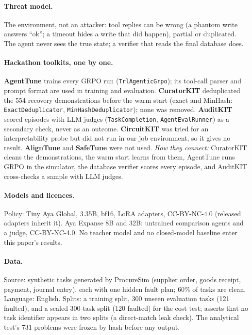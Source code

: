 {\paragraph{Threat model.} The environment, not an attacker: tool replies can be wrong (a phantom write answers ``ok'';
a timeout hides a write that did happen), partial or duplicated. The agent never sees the true state; a verifier that
reads the final database does.

\paragraph{Hackathon toolkits, one by one.}
\textbf{AgentTune} trains every GRPO run (\texttt{TrlAgenticGrpo}); its tool-call parser and prompt format are used in
training and evaluation. \textbf{CuratorKIT} deduplicated the 554 recovery demonstrations before the warm start (exact
and MinHash: \texttt{ExactDeduplicator}, \texttt{MinHashDeduplicator}); none was removed. \textbf{AuditKIT} scored
episodes with LLM judges (\texttt{TaskCompletion}, \texttt{AgentEvalRunner}) as a secondary check, never as an outcome.
\textbf{CircuitKIT} was tried for an interpretability probe but did not run in our job environment, so it gives no
result. \textbf{AlignTune} and \textbf{SafeTune} were not used.
\emph{How they connect:} CuratorKIT cleans the demonstrations, the warm start learns from them, AgentTune runs GRPO in
the simulator, the database verifier scores every episode, and AuditKIT cross-checks a sample with LLM judges.

\paragraph{Models and licences.} Policy: Tiny Aya Global, 3.35B, bf16, LoRA adapters, CC-BY-NC-4.0 (released adapters
inherit it). Aya Expanse 8B and 32B: untrained comparison agents and a judge, CC-BY-NC-4.0. No teacher model and no
closed-model baseline enter this paper's results.

\paragraph{Data.} Source: synthetic tasks generated by ProcureSim (supplier order, goods receipt, payment, journal
entry), each with one hidden fault plan; 60\% of tasks are clean. Language: English. Splits: a training split, 300
unseen evaluation tasks (121 faulted), and a sealed 300-task split (120 faulted) for the cost test;
 asserts that no task identifier appears in two splits (a direct-match leak check). The
analytical test's 731 problems were frozen by hash before any output.

}
